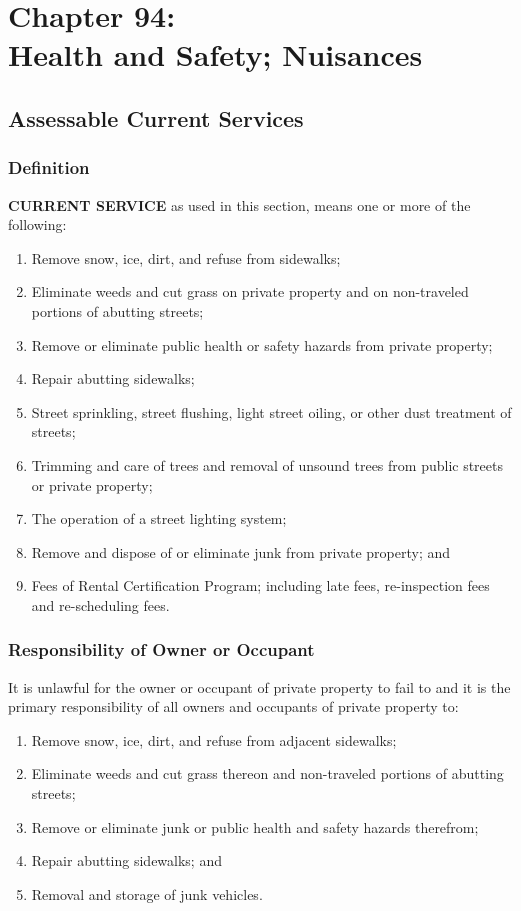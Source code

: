 \chapter*{Chapter 94: \\
	Health and Safety; Nuisances}
    \vfill
    \minitoc
    \pagebreak


\section{Assessable Current Services}
\subsection{Definition}
\textbf{CURRENT SERVICE} as used in this section, means one or more of the following: 
\begin{enumerate}[{\indent}1)]
    \item Remove snow, ice, dirt, and refuse from sidewalks; 
    \item Eliminate weeds and cut grass on private property and on non-traveled portions of abutting streets; 
    \item Remove or eliminate public health or safety hazards from private property; 
    \item Repair abutting sidewalks; 
    \item Street sprinkling, street flushing, light street oiling, or other dust treatment of streets; 
    \item Trimming and care of trees and removal of unsound trees from public streets or private property; 
    \item The operation of a street lighting system; 
    \item Remove and dispose of or eliminate junk from private property; and
    \item Fees of Rental Certification Program; including late fees, re-inspection fees and re-scheduling fees.
\end{enumerate}
\subsection{Responsibility of Owner or Occupant}
It is unlawful for the owner or occupant of private property to fail to and it is the primary responsibility of all owners and occupants of private property to: 
\begin{enumerate}[{\indent}1)]
    \item Remove snow, ice, dirt, and refuse from adjacent sidewalks; 
    \item Eliminate weeds and cut grass thereon and non-traveled portions of abutting streets; 
    \item Remove or eliminate junk or public health and safety hazards therefrom; 
    \item Repair abutting sidewalks; and
    \item Removal and storage of junk vehicles.
\end{enumerate}

